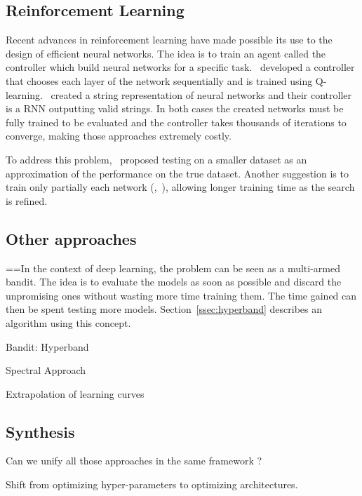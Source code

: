 \subsection{Reinforcement Learning}

Recent advances in reinforcement learning have made possible its use to the design of efficient neural networks. The idea is to train an agent called the controller which build neural networks for a specific task.~\textcite{baker2017ICLR} developed a controller that chooses each layer of the network sequentially and is trained using Q-learning.~\textcite{zoph2017ICLR} created a string representation of neural networks and their controller is a RNN outputting valid strings. In both cases the created networks must be fully trained to be evaluated and the controller takes thousands of iterations to converge, making those approaches extremely costly.

To address this problem,~\textcite{zoph2017} proposed testing on a smaller dataset as an approximation of the performance on the true dataset. Another suggestion is to train only partially each network (\textcite{li2017ICLR},~\textcite{zela2018}), allowing longer training time as the search is refined.

\subsection{Other approaches}

==In the context of deep learning, the problem can be seen as a multi-armed bandit. The idea is to evaluate the models as soon as possible and discard the unpromising ones without wasting more time training them. The time gained can then be spent testing more models. Section~\ref{ssec:hyperband} describes an algorithm using this concept.

Bandit: Hyperband~\textcite{li2017ICLR}

Spectral Approach~\textcite{hazan2018ICLR}

Extrapolation of learning curves

\subsection{Synthesis}

Can we unify all those approaches in the same framework ?

Shift from optimizing hyper-parameters to optimizing architectures.

